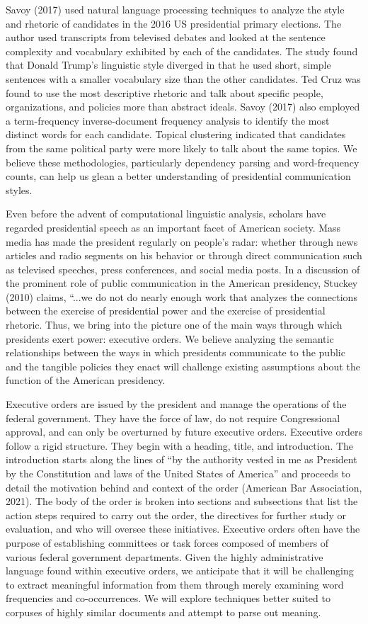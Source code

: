 \documentclass{article}
\begin{document}
{Savoy (2017) used natural language processing techniques to analyze the style and rhetoric of candidates in the 2016 US presidential primary elections. The author used transcripts from televised debates and looked at the sentence complexity and vocabulary exhibited by each of the candidates. The study found that Donald Trump’s linguistic style diverged in that he used short, simple sentences with a smaller vocabulary size than the other candidates. Ted Cruz was found to use the most descriptive rhetoric and talk about specific people, organizations, and policies more than abstract ideals. Savoy (2017) also employed a term-frequency inverse-document frequency analysis to identify the most distinct words for each candidate. Topical clustering indicated that candidates from the same political party were more likely to talk about the same topics. We believe these methodologies, particularly dependency parsing and word-frequency counts, can help us glean a better understanding of presidential communication styles.

Even before the advent of computational linguistic analysis, scholars have regarded presidential speech as an important facet of American society. Mass media has made the president regularly on people’s radar: whether through news articles and radio segments on his behavior or through direct communication such as televised speeches, press conferences, and social media posts. In a discussion of the prominent role of public communication in the American presidency, Stuckey (2010) claims, “...we do not do nearly enough work that analyzes the connections between the exercise of presidential power and the exercise of presidential rhetoric. Thus, we bring into the picture one of the main ways through which presidents exert power: executive orders. We believe analyzing the semantic relationships between the ways in which presidents communicate to the public and the tangible policies they enact will challenge existing assumptions about the function of the American presidency. 

Executive orders are issued by the president and manage the operations of the federal government. They have the force of law, do not require Congressional approval, and can only be overturned by future executive orders. Executive orders follow a rigid structure. They begin with a heading, title, and introduction. The introduction starts along the lines of “by the authority vested in me as President by the Constitution and laws of the United States of America” and proceeds to detail the motivation behind and context of the order (American Bar Association, 2021). The body of the order is broken into sections and subsections that list the action steps required to carry out the order, the directives for further study or evaluation, and who will oversee these initiatives. Executive orders often have the purpose of establishing committees or task forces composed of members of various federal government departments. Given the highly administrative language found within executive orders, we anticipate that it will be challenging to extract meaningful information from them through merely examining word frequencies and co-occurrences. We will explore techniques better suited to corpuses of highly similar documents and attempt to parse out meaning.

}
\end{document}
